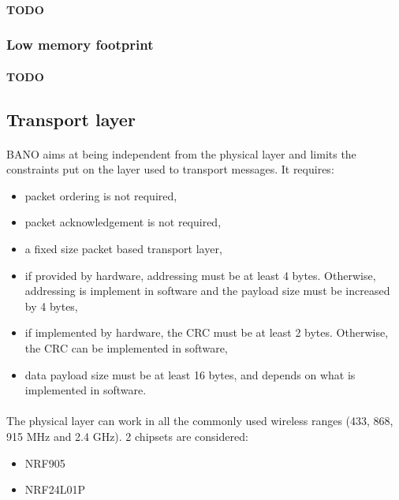 \documentclass[a4paper, 11pt]{article}
\begin{document}
\paragraph{}
\textbf{TODO}

\subsubsection{Low memory footprint}
\paragraph{}
\textbf{TODO}


\subsection{Transport layer}
\paragraph{}
BANO aims at being independent from the physical layer and limits the
constraints put on the layer used to transport messages. It requires:
\begin{itemize}
\item packet ordering is not required,
\item packet acknowledgement is not required,
\item a fixed size packet based transport layer,
\item if provided by hardware, addressing must be at least 4 bytes.
Otherwise, addressing is implement in software and the payload size must be
increased by 4 bytes,
\item if implemented by hardware, the CRC must be at least 2 bytes. Otherwise,
the CRC can be implemented in software,
\item data payload size must be at least 16 bytes, and depends on what is
implemented in software.
\end{itemize}

\paragraph{}
The physical layer can work in all the commonly used wireless ranges (433, 868,
915 MHz and 2.4 GHz). 2 chipsets are considered:
\begin{itemize}
\item NRF905
\item NRF24L01P
\end{itemize}
\end{document}
